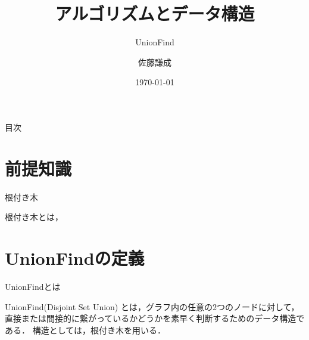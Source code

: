 

\title{アルゴリズムとデータ構造}
\subtitle{UnionFind}
\author{佐藤謙成}
\date{\today}


\maketitle

\begin{frame}[arrowframebreaks]{目次}
    \tableofcontents
\end{frame}

\section{前提知識}
\begin{frame}{根付き木}
    \begin{block}{}
        根付き木とは，
    \end{block}
\end{frame}

\section{UnionFindの定義}
\begin{frame}{UnionFindとは}
    \begin{block}{}
        UnionFind(Disjoint Set Union) とは，グラフ内の任意の2つのノードに対して，直接または間接的に繋がっているかどうかを素早く判断するためのデータ構造である．
        構造としては，根付き木を用いる．
    \end{block}
\end{frame}

